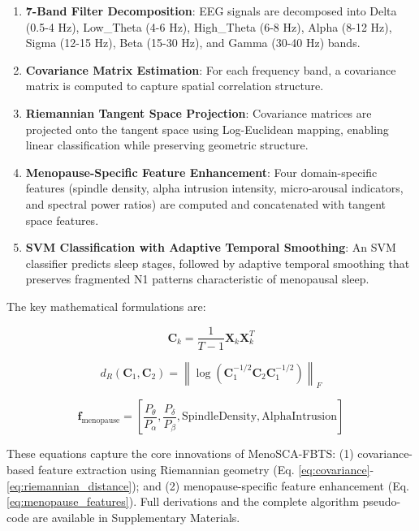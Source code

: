 \documentclass[ASNA,twocolumn]{USG}
\begin{document}
\begin{enumerate}
\item \textbf{7-Band Filter Decomposition}: EEG signals are decomposed into Delta (0.5-4 Hz), Low\_Theta (4-6 Hz), High\_Theta (6-8 Hz), Alpha (8-12 Hz), Sigma (12-15 Hz), Beta (15-30 Hz), and Gamma (30-40 Hz) bands.

\item \textbf{Covariance Matrix Estimation}: For each frequency band, a covariance matrix is computed to capture spatial correlation structure.

\item \textbf{Riemannian Tangent Space Projection}: Covariance matrices are projected onto the tangent space using Log-Euclidean mapping, enabling linear classification while preserving geometric structure.

\item \textbf{Menopause-Specific Feature Enhancement}: Four domain-specific features (spindle density, alpha intrusion intensity, micro-arousal indicators, and spectral power ratios) are computed and concatenated with tangent space features.

\item \textbf{SVM Classification with Adaptive Temporal Smoothing}: An SVM classifier predicts sleep stages, followed by adaptive temporal smoothing that preserves fragmented N1 patterns characteristic of menopausal sleep.
\end{enumerate}

The key mathematical formulations are:

\begin{equation}
\mathbf{C}_k = \frac{1}{T-1} \mathbf{X}_k \mathbf{X}_k^T
\label{eq:covariance}
\end{equation}

\begin{equation}
d_R(\mathbf{C}_1, \mathbf{C}_2) = \left\| \log\left( \mathbf{C}_1^{-1/2} \mathbf{C}_2 \mathbf{C}_1^{-1/2} \right) \right\|_F
\label{eq:riemannian_distance}
\end{equation}

\begin{equation}
\mathbf{f}_{\text{menopause}} = \left[ \frac{P_{\theta}}{P_{\alpha}}, \frac{P_{\delta}}{P_{\beta}}, \text{SpindleDensity}, \text{AlphaIntrusion} \right]
\label{eq:menopause_features}
\end{equation}

These equations capture the core innovations of MenoSCA-FBTS: (1) covariance-based feature extraction using Riemannian geometry (Eq. \ref{eq:covariance}-\ref{eq:riemannian_distance}); and (2) menopause-specific feature enhancement (Eq. \ref{eq:menopause_features}). Full derivations and the complete algorithm pseudo-code are available in Supplementary Materials.
\end{document}
